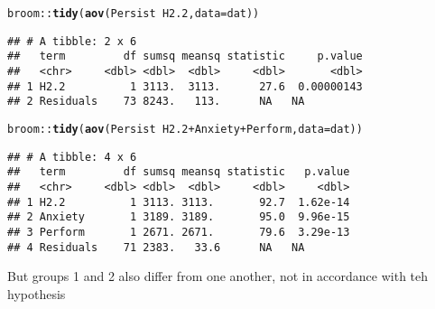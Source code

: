 \documentclass{article}\usepackage[]{graphicx}\usepackage[]{color}
\makeatletter
\newcommand{\hlopt}[1]{\textcolor[rgb]{0,0,0}{#1}}%
\newcommand{\hlstd}[1]{\textcolor[rgb]{0.345,0.345,0.345}{#1}}%
\newcommand{\hlkwc}[1]{\textcolor[rgb]{0.333,0.667,0.333}{#1}}%
\newcommand{\hlkwd}[1]{\textcolor[rgb]{0.737,0.353,0.396}{\textbf{#1}}}%
\newenvironment{kframe}{%
 \def\at@end@of@kframe{}%
 \ifinner\ifhmode%
  \def\at@end@of@kframe{\end{minipage}}%
  \begin{minipage}{\columnwidth}%
 \fi\fi%
 \def\FrameCommand##1{\hskip\@totalleftmargin \hskip-\fboxsep
 \colorbox{shadecolor}{##1}\hskip-\fboxsep
     \hskip-\linewidth \hskip-\@totalleftmargin \hskip\columnwidth}%
 \MakeFramed {\advance\hsize-\width
   \@totalleftmargin\z@ \linewidth\hsize
   \@setminipage}}%
 {\par\unskip\endMakeFramed%
 \at@end@of@kframe}
\newenvironment{knitrout}{}{} %
\makeatother
\begin{document}
\begin{knitrout}
\color{fgcolor}\begin{kframe}
\begin{alltt}
\hlstd{broom}\hlopt{::}\hlkwd{tidy}\hlstd{(}\hlkwd{aov}\hlstd{(Persist} \hlopt{~} \hlstd{H2.2,} \hlkwc{data} \hlstd{= dat))}
\end{alltt}
\begin{verbatim}
## # A tibble: 2 x 6
##   term         df sumsq meansq statistic     p.value
##   <chr>     <dbl> <dbl>  <dbl>     <dbl>       <dbl>
## 1 H2.2          1 3113.  3113.      27.6  0.00000143
## 2 Residuals    73 8243.   113.      NA   NA
\end{verbatim}
\begin{alltt}
\hlstd{broom}\hlopt{::}\hlkwd{tidy}\hlstd{(}\hlkwd{aov}\hlstd{(Persist} \hlopt{~} \hlstd{H2.2} \hlopt{+} \hlstd{Anxiety} \hlopt{+} \hlstd{Perform,} \hlkwc{data} \hlstd{= dat))}
\end{alltt}
\begin{verbatim}
## # A tibble: 4 x 6
##   term         df sumsq meansq statistic   p.value
##   <chr>     <dbl> <dbl>  <dbl>     <dbl>     <dbl>
## 1 H2.2          1 3113. 3113.       92.7  1.62e-14
## 2 Anxiety       1 3189. 3189.       95.0  9.96e-15
## 3 Perform       1 2671. 2671.       79.6  3.29e-13
## 4 Residuals    71 2383.   33.6      NA   NA
\end{verbatim}
\end{kframe}
\end{knitrout}

But groups 1 and 2 also differ from one another, not in accordance with teh hypothesis
\end{document}
